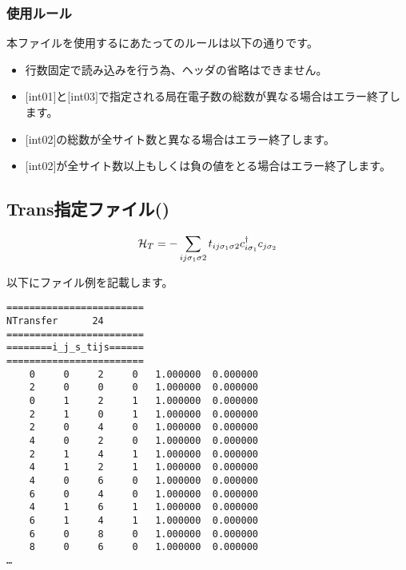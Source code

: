 \subsubsection{使用ルール}
本ファイルを使用するにあたってのルールは以下の通りです。
\begin{itemize}
\item 行数固定で読み込みを行う為、ヘッダの省略はできません。
\item $[$int01$]$と$[$int03$]$で指定される局在電子数の総数が異なる場合はエラー終了します。
\item $[$int02$]$の総数が全サイト数と異なる場合はエラー終了します。
\item $[$int02$]$が全サイト数以上もしくは負の値をとる場合はエラー終了します。
\end{itemize}


\newpage
\subsection{Trans指定ファイル()}
\label{Subsec:Trans}
\begin{align}
{\cal H}_T =-\sum_{ij\sigma_1\sigma2} t_{ij\sigma_1\sigma2}c_{i\sigma_1}^{\dag}c_{j\sigma_2}
\end{align}

以下にファイル例を記載します。\\
\begin{minipage}{12.5cm}
\begin{screen}
\begin{verbatim}
======================== 
NTransfer      24  
======================== 
========i_j_s_tijs====== 
======================== 
    0     0     2     0   1.000000  0.000000
    2     0     0     0   1.000000  0.000000
    0     1     2     1   1.000000  0.000000
    2     1     0     1   1.000000  0.000000
    2     0     4     0   1.000000  0.000000
    4     0     2     0   1.000000  0.000000
    2     1     4     1   1.000000  0.000000
    4     1     2     1   1.000000  0.000000
    4     0     6     0   1.000000  0.000000
    6     0     4     0   1.000000  0.000000
    4     1     6     1   1.000000  0.000000
    6     1     4     1   1.000000  0.000000
    6     0     8     0   1.000000  0.000000
    8     0     6     0   1.000000  0.000000
…
\end{verbatim}
\end{screen}
\end{minipage}

